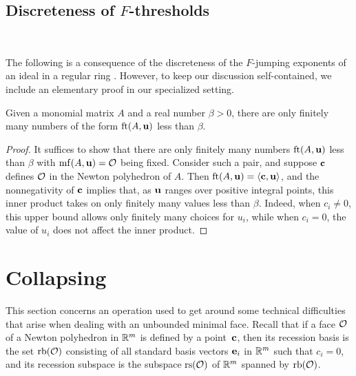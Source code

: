 \documentclass[11pt]{amsart}
\begin{document}
\subsection{Discreteness of $F$-thresholds}

\ 


The following is a consequence of the discreteness of the $F$-jumping exponents of an ideal in a regular ring \cite[Theorem~3.1]{blickle+mustata+smith.discr_rat_FPTs}.
However, to keep our discussion self-contained, we include an elementary proof in our specialized setting.

\begin{proposition}
\label{discreteness: L}
Given a monomial matrix $A$ and a real number $\beta > 0 $, there are only finitely many numbers of the form $\operatorname{ft}(A, \mathbf{u})$ less than $\beta$.
\end{proposition}

\begin{proof}
   It suffices to show that there are only finitely many numbers $\operatorname{ft}(A, \mathbf{u})$ less than $\beta$ with $\operatorname{mf}(A, \mathbf{u}) = \mathcal{O}$ being fixed.
   Consider such a pair, and suppose $\mathbf{c}$ defines $\mathcal{O}$ in the Newton polyhedron of $A$.
   Then $\operatorname{ft}(A, \mathbf{u}) = \langle \mathbf{c}, \mathbf{u} \rangle$, and the nonnegativity of $\mathbf{c}$ implies that, as $\mathbf{u}$ ranges over positive integral points, this inner product takes on only finitely many values less than $\beta$.
   Indeed, when $c_i \ne 0$, this upper bound allows only finitely many choices for $u_i$, while when $c_i = 0$, the value of $u_i$ does not affect the inner product.
\end{proof}


\newpage
\section{Collapsing}



This section concerns an operation used to get around some technical difficulties that arise when dealing with an unbounded minimal face.
Recall that if a face $\mathcal{O}$ of a Newton polyhedron in $\mathbb{R}^m$ is defined by a point~$\mathbf{c}$, then its recession basis is the set $\operatorname{rb}(\mathcal{O})$ consisting of all standard basis vectors $\mathbf{e}_i$ in $\mathbb{R}^m$ such that $c_i = 0$, and its recession subspace is the subspace $\operatorname{rs}(\mathcal{O})$ of $\mathbb{R}^m$ spanned by $\operatorname{rb}(\mathcal{O})$.
\end{document}
